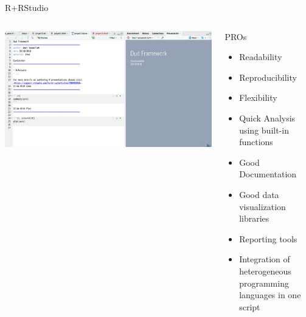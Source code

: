\documentclass[aspectratio=169,10pt]{beamer}
\begin{document}
\begin{frame}[fragile]{R+RStudio}
\begin{columns}
\begin{column}{0.65\textwidth}
\includegraphics[width=\textwidth]{amal-fr4.pdf}
\end{column}
\begin{column}{0.35\textwidth}
 \begin{alertblock}{PROs}
\begin{itemize}
    \item Readability
    \item Reproducibility 
     \item Flexibility
    \item Quick Analysis using built-in functions
   \item  Good Documentation
\item  Good data visualization libraries 
\item Reporting tools 
\item Integration of heterogeneous programming languages in one script 
\end{itemize}
\end{alertblock}
\end{column}
\end{columns}
\end{frame}
\end{document}
